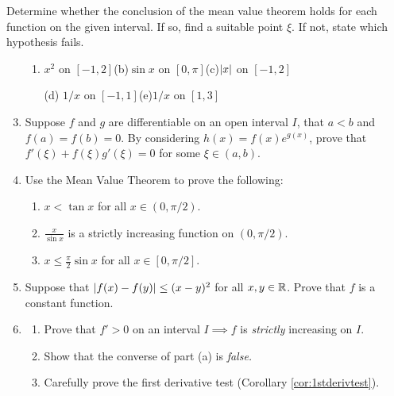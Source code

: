 
\begin{exercises}
\exstart Determine whether the conclusion of the mean value theorem holds for each function on the given interval. If so, find a suitable point $\xi$. If not, state which hypothesis fails.
\begin{enumerate}\setcounter{enumi}{1}\itemsep0pt
  \item[]\begin{enumerate}
    \item $x^2$ on $[-1,2]$\qquad\qquad (b)\space\space $\sin x$ on $[0,\pi]$\qquad\qquad (c)\space\space $\left| x\right|$ on $[-1,2]$
    \item[(d)] $1/x$ on $[-1,1]$\qquad\qquad (e)\space\space $1/x$ on $[1,3]$
  \end{enumerate}
  
  \item Suppose $f$ and $g$ are differentiable on an open interval $I$, that $a<b$ and $f(a)=f(b)=0$. By considering $h(x)=f(x)e^{g(x)}$, prove that $f'(\xi)+f(\xi)g'(\xi)=0$ for some $\xi\in (a,b)$.
  
  \item Use the Mean Value Theorem to prove the following:\vspace{-5pt}
  \begin{enumerate}
    \item $x<\tan x$ for all $x\in(0,\pi/2)$.
    \item $\frac{x}{\sin x}$ is a strictly increasing function on $(0,\pi/2)$.
    \item $x\le\frac{\pi}2\sin x$ for all $x\in[0,\pi/2]$.
  \end{enumerate}
  
  \item Suppose that $\left| f(x)-f(y)\right|\le (x-y)^2$ for all $x,y\in\mathbb{R}$. Prove that $f$ is a constant function.  
  
	\item\begin{enumerate}
	  \item Prove that $f'>0$ on an interval $I\implies f$ is \emph{strictly} increasing on $I$.
	  \item Show that the converse of part (a) is \emph{false.}
  	\item Carefully prove the first derivative test (Corollary \ref{cor:1stderivtest}).
	\end{enumerate}
	

\end{enumerate}
\end{exercises}
